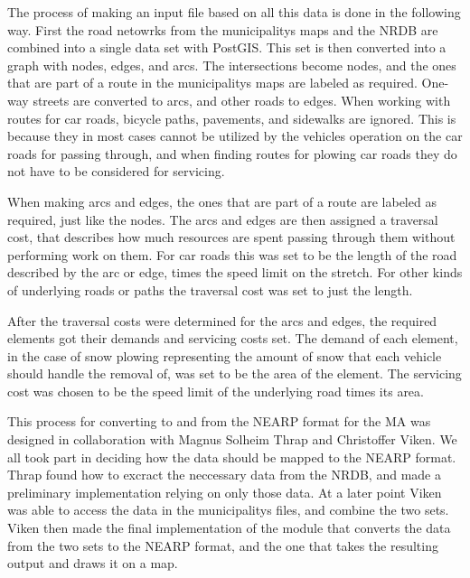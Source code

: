 The process of making an input file based on all this data is done in the following way. First the road netowrks from the municipalitys maps and the NRDB are combined into a single data set with PostGIS. This set is then converted into a graph with nodes, edges, and arcs. The intersections become nodes, and the ones that are part of a route in the municipalitys maps are labeled as required. One-way streets are converted to arcs, and other roads to edges. When working with routes for car roads, bicycle paths, pavements, and sidewalks are ignored. This is because they in most cases cannot be utilized by the vehicles operation on the car roads for passing through, and when finding routes for plowing car roads they do not have to be considered for servicing.

When making arcs and edges, the ones that are part of a route are labeled as required, just like the nodes. The arcs and edges are then assigned a traversal cost, that describes how much resources are spent passing through them without performing work on them. For car roads this was set to be the length of the road described by the arc or edge, times the speed limit on the stretch. For other kinds of underlying roads or paths the traversal cost was set to just the length.

After the traversal costs were determined for the arcs and edges, the required elements got their demands and servicing costs set. The demand of each element, in the case of snow plowing representing the amount of snow that each vehicle should handle the removal of, was set to be the area of the element. The servicing cost was chosen to be the speed limit of the underlying road times its area.

This process for converting to and from the NEARP format for the MA was designed in collaboration with Magnus Solheim Thrap and Christoffer Viken. We all took part in deciding how the data should be mapped to the NEARP format. Thrap found how to excract the neccessary data from the NRDB, and made a preliminary implementation relying on only those data. At a later point Viken was able to access the data in the municipalitys files, and combine the two sets. Viken then made the final implementation of the module that converts the data from the two sets to the NEARP format, and the one that takes the resulting output and draws it on a map.





